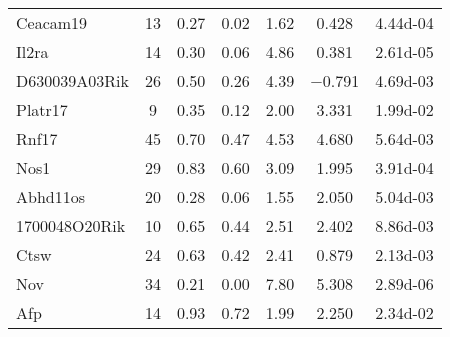 {\begin{longtable}[l]{p{3.6cm}cccccc}
Ceacam19	& \num{13}	& \num{0.27}	& \num{0.02}	& \num{1.62}	& \num{ 0.428}	& \num{4.44d-04}\\ 
Il2ra	& \num{14}	& \num{0.30}	& \num{0.06}	& \num{4.86}	& \num{ 0.381}	& \num{2.61d-05}\\ 
D630039A03Rik	& \num{26}	& \num{0.50}	& \num{0.26}	& \num{4.39}	& \num{-0.791}	& \num{4.69d-03}\\ 
Platr17	& \num{ 9}	& \num{0.35}	& \num{0.12}	& \num{2.00}	& \num{ 3.331}	& \num{1.99d-02}\\ 
Rnf17	& \num{45}	& \num{0.70}	& \num{0.47}	& \num{4.53}	& \num{ 4.680}	& \num{5.64d-03}\\ 
Nos1	& \num{29}	& \num{0.83}	& \num{0.60}	& \num{3.09}	& \num{ 1.995}	& \num{3.91d-04}\\ 
Abhd11os	& \num{20}	& \num{0.28}	& \num{0.06}	& \num{1.55}	& \num{ 2.050}	& \num{5.04d-03}\\ 
1700048O20Rik	& \num{10}	& \num{0.65}	& \num{0.44}	& \num{2.51}	& \num{ 2.402}	& \num{8.86d-03}\\ 
Ctsw	& \num{24}	& \num{0.63}	& \num{0.42}	& \num{2.41}	& \num{ 0.879}	& \num{2.13d-03}\\ 
Nov	& \num{34}	& \num{0.21}	& \num{0.00}	& \num{7.80}	& \num{ 5.308}	& \num{2.89d-06}\\ 
Afp	& \num{14}	& \num{0.93}	& \num{0.72}	& \num{1.99}	& \num{ 2.250}	& \num{2.34d-02}\\ 
\end{longtable}
}



